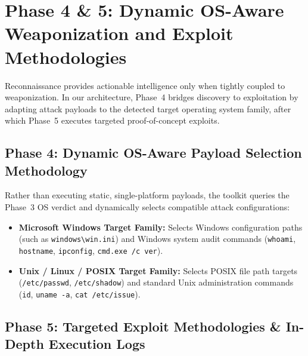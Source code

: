 \section{Phase 4 \& 5: Dynamic OS-Aware Weaponization and Exploit Methodologies}\label{sec:exploits}

Reconnaissance provides actionable intelligence only when tightly coupled to weaponization. In our
architecture, Phase~4 bridges discovery to exploitation by adapting attack payloads to the detected
target operating system family, after which Phase~5 executes targeted proof-of-concept exploits.

\subsection{Phase 4: Dynamic OS-Aware Payload Selection Methodology}
Rather than executing static, single-platform payloads, the toolkit queries the Phase~3 OS verdict
and dynamically selects compatible attack configurations:
\begin{itemize}
    \item \textbf{Microsoft Windows Target Family:} Selects Windows configuration paths (such as
    \texttt{windows\textbackslash win.ini}) and Windows system audit commands (\texttt{whoami},
    \texttt{hostname}, \texttt{ipconfig}, \texttt{cmd.exe /c ver}).
    \item \textbf{Unix / Linux / POSIX Target Family:} Selects POSIX file path targets
    (\texttt{/etc/passwd}, \texttt{/etc/shadow}) and standard Unix administration commands
    (\texttt{id}, \texttt{uname -a}, \texttt{cat /etc/issue}).
\end{itemize}

\subsection{Phase 5: Targeted Exploit Methodologies \& In-Depth Execution Logs}

